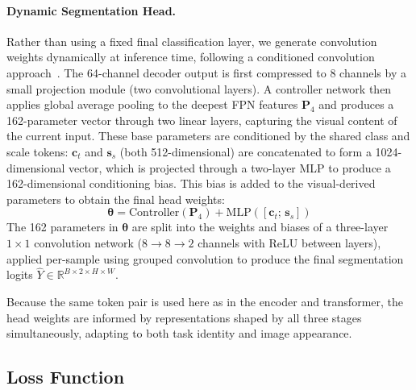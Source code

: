 \documentclass[runningheads]{llncs}
\begin{document}
\paragraph{Dynamic Segmentation Head.}
Rather than using a fixed final classification layer, we generate convolution weights dynamically at inference time, following a conditioned convolution approach~\cite{tian2020condinst,dai2021dynamic}. The 64-channel decoder output is first compressed to 8 channels by a small projection module (two convolutional layers). A controller network then applies global average pooling to the deepest FPN features $\mathbf{P}_4$ and produces a 162-parameter vector through two linear layers, capturing the visual content of the current input. These base parameters are conditioned by the shared class and scale tokens: $\mathbf{c}_t$ and $\mathbf{s}_s$ (both 512-dimensional) are concatenated to form a 1024-dimensional vector, which is projected through a two-layer MLP to produce a 162-dimensional conditioning bias. This bias is added to the visual-derived parameters to obtain the final head weights:
\begin{equation}
    \boldsymbol{\theta} = \text{Controller}(\mathbf{P}_4) + \text{MLP}([\mathbf{c}_t;\, \mathbf{s}_s])
\end{equation}
The 162 parameters in $\boldsymbol{\theta}$ are split into the weights and biases of a three-layer $1 \times 1$ convolution network ($8 \to 8 \to 2$ channels with ReLU between layers), applied per-sample using grouped convolution to produce the final segmentation logits $\hat{Y} \in \mathbb{R}^{B \times 2 \times H \times W}$.

Because the same token pair is used here as in the encoder and transformer, the head weights are informed by representations shaped by all three stages simultaneously, adapting to both task identity and image appearance.


\subsection{Loss Function}
\label{sec:loss}
\end{document}
